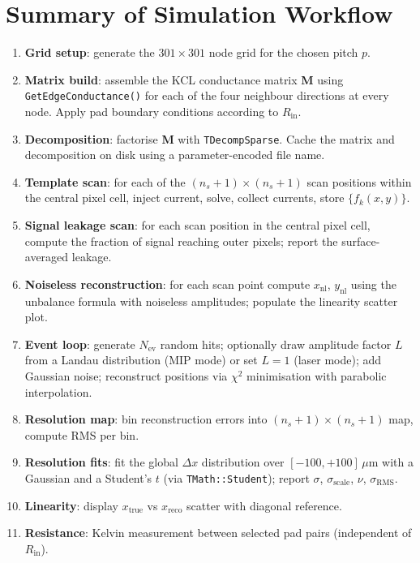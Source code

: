 \documentclass[preprint,numbers,1p]{elsarticle}
\begin{document}
\section{Summary of Simulation Workflow}
\label{sec:workflow}

\begin{enumerate}
  \item \textbf{Grid setup}: generate the $301\times301$ node grid for the chosen pitch $p$.
  \item \textbf{Matrix build}: assemble the KCL conductance matrix \textbf{M} using
        \texttt{GetEdgeConductance()} for each of the four neighbour directions at every node.
        Apply pad boundary conditions according to $R_\mathrm{in}$.
  \item \textbf{Decomposition}: factorise \textbf{M} with \texttt{TDecompSparse}.
        Cache the matrix and decomposition on disk using a parameter-encoded file name.
  \item \textbf{Template scan}: for each of the $(n_s+1)\times(n_s+1)$ scan positions within the central
        pixel cell, inject current, solve, collect currents, store $\{f_k(x,y)\}$.
  \item \textbf{Signal leakage scan}: for each scan position in the central pixel cell, compute
        the fraction of signal reaching outer pixels; report the surface-averaged leakage.
  \item \textbf{Noiseless reconstruction}: for each scan point compute $x_\mathrm{nl}$, $y_\mathrm{nl}$
        using the unbalance formula with noiseless amplitudes; populate the linearity scatter plot.
  \item \textbf{Event loop}: generate $N_\mathrm{ev}$ random hits; optionally draw amplitude factor
        $L$ from a Landau distribution (MIP mode) or set $L=1$ (laser mode); add Gaussian noise;
        reconstruct positions via $\chi^2$ minimisation with parabolic interpolation.
  \item \textbf{Resolution map}: bin reconstruction errors into $(n_s+1)\times(n_s+1)$ map, compute
        RMS per bin.
  \item \textbf{Resolution fits}: fit the global $\Delta x$ distribution over $[-100,+100]\,\mu$m
        with a Gaussian and a Student's $t$ (via \texttt{TMath::Student});
        report $\sigma$, $\sigma_\mathrm{scale}$, $\nu$, $\sigma_\mathrm{RMS}$.
  \item \textbf{Linearity}: display $x_\mathrm{true}$ vs $x_\mathrm{reco}$ scatter with diagonal reference.
  \item \textbf{Resistance}: Kelvin measurement between selected pad pairs (independent of $R_\mathrm{in}$).
\end{enumerate}
\end{document}
